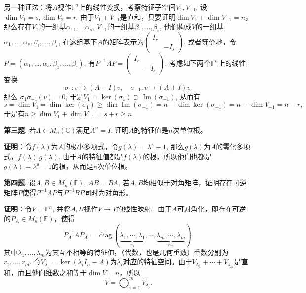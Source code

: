 另一种证法：将$A$视作$\mathbb{F}^n$上的线性变换，考察特征子空间$V_1, V_{-1}$, 设$\dim V_1 = s, \dim V_2 = r$. 由于$V_1 + V_{-1}$是直和，只要证明$\dim V_1 + \dim V_{-1} = n$，那么存在$V_1$的一组基$\alpha_1, \ldots, \alpha_s$, $V_{-1}$的一组基$\beta_1, \ldots, \beta_r$, 他们构成$V$的一组基$\alpha_1, \ldots, \alpha_s, \beta_1, \ldots, \beta_r$, 在这组基下$A$的矩阵表示为$\begin{pmatrix} I_r & \\ & -I_s \end{pmatrix}$. 或者等价地，令$P = (\alpha_1, \ldots, \alpha_s, \beta_1, \ldots, \beta_r)$, 有$P^{-1}AP = \begin{pmatrix} I_r & \\ & -I_s \end{pmatrix}$. 考虑如下两个$\mathbb{F}^n$上的线性变换
$$\sigma_1: v \mapsto (A-I)v, \quad \sigma_{-1}: v \mapsto (A+I)v.$$
那么
$\sigma_1\sigma_{-1}(v) = 0$, 于是$V_1 = \ker (\sigma_1) \supset \operatorname{Im} (\sigma_{-1})$, 从而有
$$s = \dim V_1 = \dim \ker (\sigma_1) \geqslant \dim \operatorname{Im} (\sigma_{-1}) = n - \dim \ker (\sigma_{-1}) = n - \dim V_{-1} = n - r,$$
于是有$n \geqslant \dim V_1 + \dim V_{-1} = s + r \geqslant n$.


\newpageorvspace


{\bf 第三题}. 若$A \in M_n (\mathbb{C})$满足$A^n = I$, 证明$A$的特征值是$n$次单位根。

{\bf 证明}：令$f(\lambda)$为$A$的极小多项式，令$g(\lambda) = \lambda^n - 1$, 那么$g(\lambda)$为$A$的零化多项式，$f(\lambda) | g(\lambda)$. 由于$A$的特征值都是$f(\lambda)$的根，所以他们也都是$g(\lambda) = \lambda^n - 1$的根，从而是$n$次单位根。


\newpageorvspace


{\bf 第四题}. 设$A, B \in M_n(\mathbb{F})$, $AB=BA$, 若$A,B$均相似于对角矩阵，证明存在可逆矩阵$P$使得$P^{-1}AP$与$P^{-1}BP$同时为对角形。

{\bf 证明}：令$V = \mathbb{F}^n$, 并将$A,B$视作$V \to V$的线性映射。由于$A$可对角化，即存在可逆的$P_A \in M_n(\mathbb{F})$，使得
$$P_A^{-1}AP_A = \operatorname{diag} (\underbrace{\lambda_1,\cdots,\lambda_1}_{r_1}, \cdots, \underbrace{\lambda_m,\cdots,\lambda_m}_{r_m}).$$
其中$\lambda_1, \ldots, \lambda_m$为其互不相等的特征值，（代数，也是几何重数）重数分别为$r_1,\ldots,r_m$. 令$V_{\lambda_i} = \ker (\lambda_i I_n - A)$为$\lambda_i$对应的特征空间。由于$V_{\lambda_1} + \cdots + V_{\lambda_m}$是直和，而且他们维数之和等于$\dim V = n$，所以
$$V = \bigoplus_{i=1}^m V_{\lambda_i}.$$

